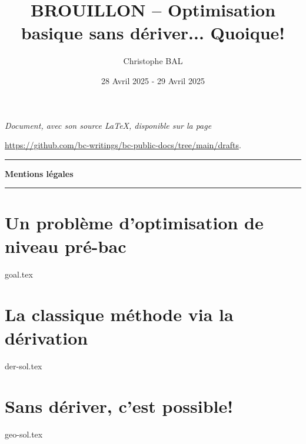 \documentclass[12pt]{amsart}
\begin{document}
\title{BROUILLON -- Optimisation basique sans dériver... Quoique!}
\author{Christophe BAL}
\date{28 Avril 2025 - 29 Avril 2025}

\maketitle

\begin{center}
	\itshape
	Document, avec son source \LaTeX, disponible sur la page

	\url{https://github.com/bc-writings/bc-public-docs/tree/main/drafts}.
\end{center}


\bigskip


\begin{center}
	\hrule\vspace{.3em}
	{
		\fontsize{1.35em}{1em}\selectfont
		\textbf{Mentions \og légales \fg}
	}

	\vspace{0.45em}
	\doclicenseThis
	\hrule
\end{center}


\bigskip


\setcounter{tocdepth}{2}
\tableofcontents




\newpage





\section{Un problème d'optimisation de niveau pré-bac}

{goal.tex}





\section{La classique méthode via la dérivation}

{der-sol.tex}




\section{Sans dériver, c'est possible!}

{geo-sol.tex}
\end{document}
